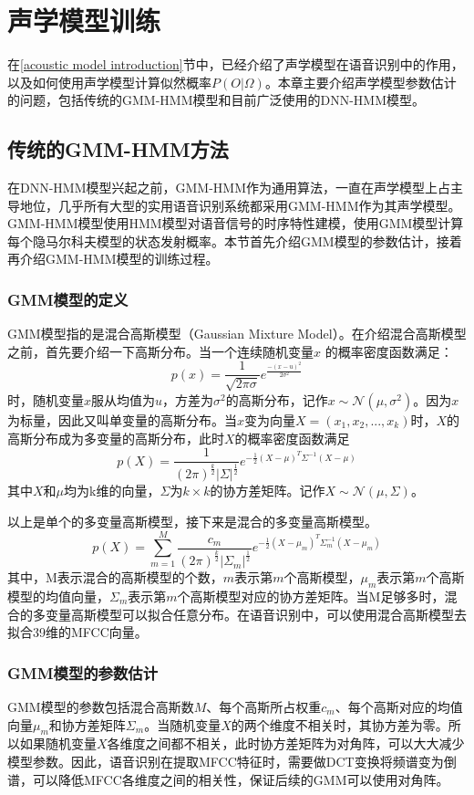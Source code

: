 
\chapter{声学模型训练}
在\ref{acoustic model introduction}节中，已经介绍了声学模型在语音识别中的作用，以及如何使用声学模型计算似然概率$P(O|\Omega)$。本章主要介绍声学模型参数估计的问题，包括传统的GMM-HMM模型和目前广泛使用的DNN-HMM模型。
\section{传统的GMM-HMM方法}
在DNN-HMM模型兴起之前，GMM-HMM作为通用算法，一直在声学模型上占主导地位，几乎所有大型的实用语音识别系统都采用GMM-HMM作为其声学模型。GMM-HMM模型使用HMM模型对语音信号的时序特性建模，使用GMM模型计算每个隐马尔科夫模型的状态发射概率。本节首先介绍GMM模型的参数估计，接着再介绍GMM-HMM模型的训练过程。
\subsection{GMM模型的定义}
GMM模型指的是混合高斯模型（Gaussian Mixture Model）。在介绍混合高斯模型之前，首先要介绍一下高斯分布。当一个连续随机变量$x$ 的概率密度函数满足：\begin{equation}p(x)=\frac{1}{\sqrt{2\pi\sigma}}e^{\frac{-(x-u)^2}{2\sigma^2}}\end{equation} 时，随机变量$x$服从均值为$u$，方差为$\sigma^2$的高斯分布，记作$x\sim \mathcal{N}(\mu,\sigma^2)$。因为$x$为标量，因此又叫单变量的高斯分布。当$x$变为向量$X=(x_1,x_2,...,x_k)$时，$X$的高斯分布成为多变量的高斯分布，此时$X$的概率密度函数满足\begin{equation}p(X)=\frac{1}{(2\pi)^{\frac{k}{2}}|\Sigma|^{\frac{1}{2}}}e^{-\frac{1}{2}(X-\mu)^T\Sigma^{-1}(X-\mu)} \end{equation}
其中$X$和$\mu$均为k维的向量，$\Sigma$为$k\times k$的协方差矩阵。记作$X\sim \mathcal{N}(\mu,\Sigma)$。

以上是单个的多变量高斯模型，接下来是混合的多变量高斯模型。
\begin{equation}p(X)=\sum_{m=1}^M \frac{c_m}{(2\pi)^{\frac{k}{2}}|\Sigma_m|^{\frac{1}{2}}}e^{-\frac{1}{2}(X-\mu_m)^T\Sigma_m^{-1}(X-\mu_m)}\end{equation} 其中，M表示混合的高斯模型的个数，$m$表示第$m$个高斯模型，$\mu_m$表示第$m$个高斯模型的均值向量，$\Sigma_m$表示第$m$个高斯模型对应的协方差矩阵。当M足够多时，混合的多变量高斯模型可以拟合任意分布。在语音识别中，可以使用混合高斯模型去拟合39维的MFCC向量。
\subsection{GMM模型的参数估计}\label{acousticmodel}
GMM模型的参数包括混合高斯数$M$、每个高斯所占权重$c_m$、每个高斯对应的均值向量$\mu_m$和协方差矩阵$\Sigma_m$。当随机变量$X$的两个维度不相关时，其协方差为零。所以如果随机变量$X$各维度之间都不相关，此时协方差矩阵为对角阵，可以大大减少模型参数。因此，语音识别在提取MFCC特征时，需要做DCT变换将频谱变为倒谱，可以降低MFCC各维度之间的相关性，保证后续的GMM可以使用对角阵。

